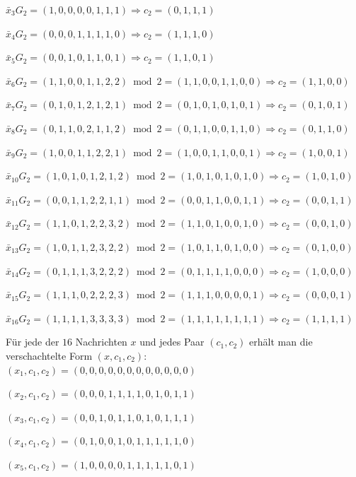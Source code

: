 \begin{Beispiel}
    $\bar{x}_{3}G_2= (1,0,0,0,0,1,1,1) \Rightarrow c_2= (0,1,1,1)$
    
    $\bar{x}_{4}G_2= (0,0,0,1,1,1,1,0) \Rightarrow c_2= (1,1,1,0)$
    
    $\bar{x}_{5}G_2= (0,0,1,0,1,1,0,1) \Rightarrow c_2= (1,1,0,1)$
    
    $\bar{x}_{6}G_2= (1,1,0,0,1,1,2,2) \bmod 2 = (1,1,0,0,1,1,0,0) \Rightarrow c_2= (1,1,0,0)$
    
    $\bar{x}_{7}G_2= (0,1,0,1,2,1,2,1) \bmod 2 = (0,1,0,1,0,1,0,1) \Rightarrow c_2= (0,1,0,1)$
    
    $\bar{x}_{8}G_2= (0,1,1,0,2,1,1,2) \bmod 2 = (0,1,1,0,0,1,1,0) \Rightarrow c_2= (0,1,1,0)$
    
    $\bar{x}_{9}G_2= (1,0,0,1,1,2,2,1) \bmod 2 = (1,0,0,1,1,0,0,1) \Rightarrow c_2= (1,0,0,1)$
    
    $\bar{x}_{10}G_2= (1,0,1,0,1,2,1,2) \bmod 2 = (1,0,1,0,1,0,1,0) \Rightarrow c_2= (1,0,1,0)$
    
    $\bar{x}_{11}G_2= (0,0,1,1,2,2,1,1) \bmod 2 = (0,0,1,1,0,0,1,1) \Rightarrow c_2= (0,0,1,1)$
    
    $\bar{x}_{12}G_2= (1,1,0,1,2,2,3,2) \bmod 2 = (1,1,0,1,0,0,1,0) \Rightarrow c_2= (0,0,1,0)$
    
    $\bar{x}_{13}G_2= (1,0,1,1,2,3,2,2) \bmod 2 = (1,0,1,1,0,1,0,0) \Rightarrow c_2= (0,1,0,0)$
    
    $\bar{x}_{14}G_2= (0,1,1,1,3,2,2,2) \bmod 2 = (0,1,1,1,1,0,0,0) \Rightarrow c_2= (1,0,0,0)$
    
    $\bar{x}_{15}G_2= (1,1,1,0,2,2,2,3) \bmod 2 = (1,1,1,0,0,0,0,1) \Rightarrow c_2= (0,0,0,1)$
    
    $\bar{x}_{16}G_2= (1,1,1,1,3,3,3,3) \bmod 2 = (1,1,1,1,1,1,1,1) \Rightarrow c_2= (1,1,1,1)$\\
    \pagebreak
    
    Für jede der $16$ Nachrichten $x$ und jedes Paar $(c_1,c_2)$ erhält man die verschachtelte Form $(x,c_1,c_2):$\\
    
    $(x_1, c_1, c_2) = (0,0,0,0, 0,0,0,0, 0,0,0,0)$
    
    
    $(x_2, c_1, c_2) = (0,0,0,1, 1,1,1,0, 1,0,1,1)$
    
    
    $(x_3, c_1, c_2) = (0,0,1,0, 1,1,0,1, 0,1,1,1)$
    
    
    $(x_4, c_1, c_2) = (0,1,0,0, 1,0,1,1, 1,1,1,0)$
    
    
    $(x_5, c_1, c_2) = (1,0,0,0, 0,1,1,1, 1,1,0,1)$
    

\end{Beispiel}
